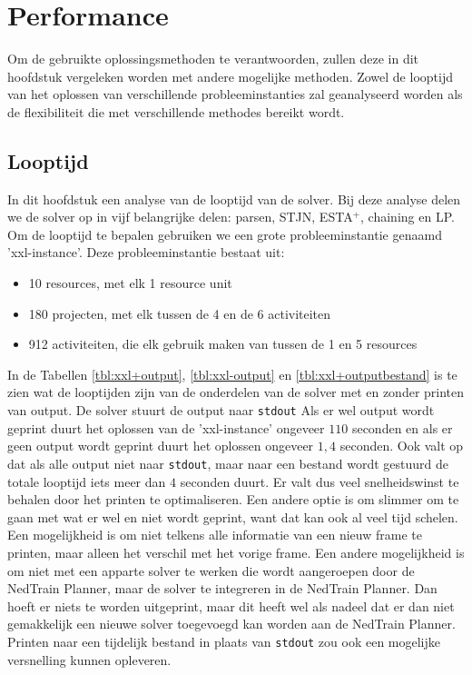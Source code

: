 \section{Performance}
Om de gebruikte oplossingsmethoden te verantwoorden, zullen deze in dit hoofdstuk vergeleken worden met andere mogelijke methoden. Zowel de looptijd van het oplossen van verschillende probleeminstanties zal geanalyseerd worden als de flexibiliteit die met verschillende methodes bereikt wordt.

\subsection{Looptijd}
In dit hoofdstuk een analyse van de looptijd van de solver. Bij deze analyse delen we de solver op in vijf belangrijke delen: parsen, STJN, ESTA$^+$, chaining en LP. Om de looptijd te bepalen gebruiken we een grote probleeminstantie genaamd 'xxl-instance'. Deze probleeminstantie bestaat uit:
\begin{itemize}
    \item 10 resources, met elk 1 resource unit
    \item 180 projecten, met elk tussen de 4 en de 6 activiteiten
    \item 912 activiteiten, die elk gebruik maken van tussen de 1 en 5 resources
\end{itemize}

In de Tabellen \ref{tbl:xxl+output}, \ref{tbl:xxl-output} en \ref{tbl:xxl+outputbestand} is te zien wat de looptijden zijn van de onderdelen van de solver met en zonder printen van output. De solver stuurt de output naar \texttt{stdout} Als er wel output wordt geprint duurt het oplossen van de 'xxl-instance' ongeveer $110$ seconden en als er geen output wordt geprint duurt het oplossen ongeveer $1,4$ seconden. Ook valt op dat als alle output niet naar \texttt{stdout}, maar naar een bestand wordt gestuurd de totale looptijd iets meer dan $4$ seconden duurt. Er valt dus veel snelheidswinst te behalen door het printen te optimaliseren. Een andere optie is om slimmer om te gaan met wat er wel en niet wordt geprint, want dat kan ook al veel tijd schelen. Een mogelijkheid is om niet telkens alle informatie van een nieuw frame te printen, maar alleen het verschil met het vorige frame. Een andere mogelijkheid is om niet met een apparte solver te werken die wordt aangeroepen door de NedTrain Planner, maar de solver te integreren in de NedTrain Planner. Dan hoeft er niets te worden uitgeprint, maar dit heeft wel als nadeel dat er dan niet gemakkelijk een nieuwe solver toegevoegd kan worden aan de NedTrain Planner. Printen naar een tijdelijk bestand in plaats van \texttt{stdout} zou ook een mogelijke versnelling kunnen opleveren. 

